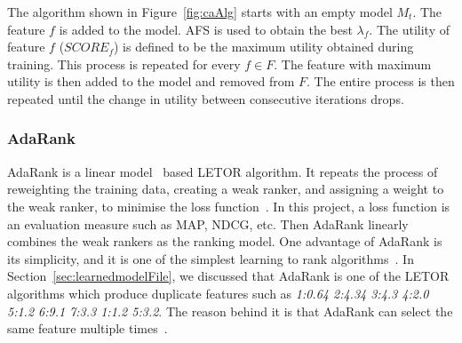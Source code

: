 The algorithm shown in Figure~\ref{fig:caAlg} starts with an empty model $M_t$. The feature $f$ is added to the model. AFS is used to 
obtain the best $\lambda_f$. The utility of feature $f$ ($SCORE_f$) is defined to be the maximum utility obtained during training. This process 
is repeated for every $f \in F$. The feature with maximum utility is then added to the model and removed from $F$. 
The entire process is then repeated until the change in utility between consecutive iterations drops.

\subsubsection{AdaRank}
AdaRank is a linear model~\cite[P. 1-4]{mlSimon} based LETOR algorithm.
It repeats the process of reweighting the training data, creating a weak ranker, and assigning a weight to the weak ranker, to minimise the loss 
function~\cite[P. 60]{letorBook}. In this project, a loss function is an evaluation measure such as MAP, NDCG, etc. Then AdaRank linearly combines the weak rankers as the ranking model. One advantage of AdaRank is its simplicity, and it is one of the simplest
learning to rank algorithms~\cite[P. 60]{letorBook}. In Section~\ref{sec:learnedmodelFile}, we discussed that AdaRank is one of the LETOR algorithms which
produce duplicate features such as \textit{1:0.64 2:4.34 3:4.3 4:2.0 5:1.2 6:9.1 7:3.3 1:1.2 5:3.2}. The reason behind it is that 
AdaRank can select the same feature multiple times~\cite{craig}.

